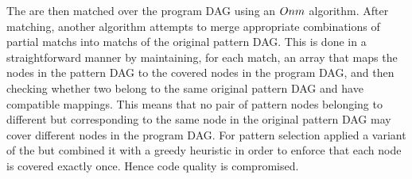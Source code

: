 %
%

The \tpartialPatterns are then matched over the \gls{program DAG} using an
\mbox{$O{nm}$} algorithm.
%
After matching, another algorithm attempts to
merge appropriate combinations of partial \glspl{match} into \glspl{match} of
the original \gls{pattern DAG}.
%
This is done in a straightforward manner by
maintaining, for each \gls{match}, an array that maps the \glspl{node} in the
\gls{pattern DAG} to the covered \glspl{node} in the \gls{program DAG}, and then
checking whether two \tpartialPatterns belong to the same original \gls{pattern
  DAG} and have compatible mappings.
%
This means that no pair of \gls{pattern}
\glspl{node} belonging to different \tpartialPatterns but corresponding to the
same \gls{node} in the original \gls{pattern DAG} may cover different
\glspl{node} in the \gls{program DAG}.
%
For \gls{pattern selection}
\citeauthor{Arnold1999b} applied a variant of the \tDPscheme but combined it
with a greedy heuristic in order to enforce that each \gls{node} is covered
exactly once.
%
Hence code quality is compromised.


